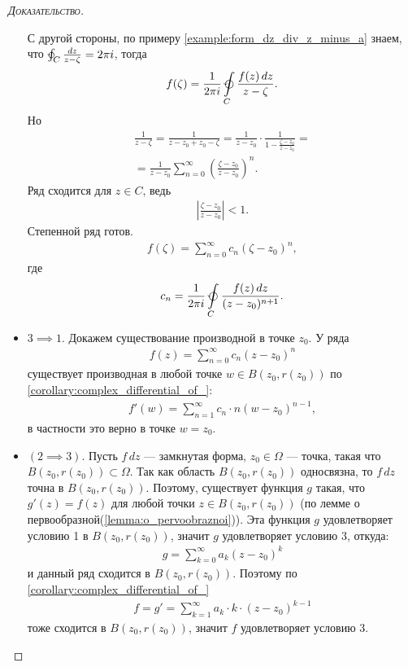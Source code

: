 \documentclass[../complex-analysis.tex]{subfiles}
\begin{document}
\begin{proof}[\normalfont\textsc{Доказательство}]
\begin{itemize}
 С другой стороны, по примеру \ref{example:form_dz_div_z_minus_a} знаем, что $\varointctrclockwise_{C} \frac{dz}{z - \zeta} = 2 \pi i$, тогда 
 \begin{align*}
  f(\zeta) = \frac{1}{2\pi i} \varointctrclockwise\limits_{C} \frac{f(z)\,dz}{z - \zeta}.
 \end{align*} Но
 \begin{align*}
  \frac{1}{z - \zeta} = \frac{1}{z - z_0 + z_0 - \zeta} = \frac{1}{z - z_0} \cdot \frac{1}{1 -  \frac{\zeta - z_0}{z - z_0}} = \\
  = \frac{1}{z-z_0} \sum_{n=0}^{\infty} \left( \frac{\zeta-z_0}{z-z_0} \right)^{n}.
 \end{align*} Ряд сходится для $z \in C$, ведь
 \begin{align*}
  \left| \frac{\zeta - z_0}{z-z_0} \right| < 1.
 \end{align*}
 Степенной ряд готов.
 \begin{align*}
  f(\zeta) = \sum_{n=0}^{\infty} c_n \left( \zeta - z_0 \right)^{n},
 \end{align*} где
 \begin{align*}
  c_n = \frac{1}{2\pi i} \varointctrclockwise\limits_{C} \frac{f(z)\,dz}{(z - z_0)^{n + 1}}.
 \end{align*} 

\item $ 3 \implies 1 $. 
    Докажем существование производной в точке $z_0$.
    У ряда 
 \begin{align*}
  f(z) = \sum_{n=0}^{\infty}c_n(z-z_0)^{n}
\end{align*} существует производная в любой точке $ w \in B(z_0, r(z_0))$ по \eqref{corollary:complex_differential_of_}:
 \begin{align*}
  f'(w) = \sum_{n=1}^{\infty} c_n \cdot n(w - z_0)^{n-1},
 \end{align*} в частности это верно в точке  $ w = z_0 $.
 
\item $ (2 \implies 3) $. Пусть $ f\,dz $ --- замкнутая форма, $ z_0 \in \Omega $ --- точка, такая что $ B(z_0, r(z_0)) \subset \Omega $.
    Так как область $ B(z_0, r(z_0)) $ односвязна, то $ f\,dz $ точна в $ B(z_0, r(z_0)) $.
    Поэтому, существует функция $ g $ такая, что $ g'(z) = f(z) $ для любой точки $ z \in B(z_0, r(z_0)) $ (по
    лемме о первообразной(\ref{lemma:o_pervoobraznoi})).
    Эта функция $ g $ удовлетворяет условию 1 в $ B(z_0, r(z_0)) $, значит
    $ g $ удовлетворяет условию $ 3 $, откуда:
 \begin{align*}
  g = \sum_{k=0}^{\infty}a_k(z-z_0)^{k}
 \end{align*} и данный ряд сходится в $B(z_0, r(z_0))$. Поэтому по \eqref{corollary:complex_differential_of_}
 \begin{align*}
  f = g' = \sum_{k=1}^{\infty}a_k \cdot k \cdot (z-z_0)^{k-1}
 \end{align*} тоже сходится в $B(z_0, r(z_0))$, 
 значит $ f $ удовлетворяет условию 3. 
 \end{itemize}
\end{proof}
\end{document}
